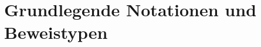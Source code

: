 \documentclass[../main.tex]{subfiles}
\begin{document}
\chapter{Grundlegende Notationen und Beweistypen}
\end{document}
